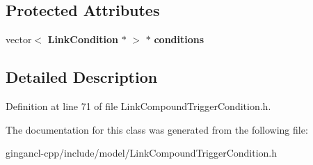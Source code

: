 \subsection*{Protected Attributes}
\begin{CompactItemize}
\item 
vector$<$ {\bf LinkCondition} $\ast$ $>$ $\ast$ {\bf conditions}\label{classbr_1_1pucrio_1_1telemidia_1_1ginga_1_1ncl_1_1model_1_1link_1_1LinkCompoundTriggerCondition_f08cf05437dde8004ae74e06ea9b6684}

\end{CompactItemize}


\subsection{Detailed Description}




Definition at line 71 of file LinkCompoundTriggerCondition.h.

The documentation for this class was generated from the following file:\begin{CompactItemize}
\item 
gingancl-cpp/include/model/LinkCompoundTriggerCondition.h\end{CompactItemize}
